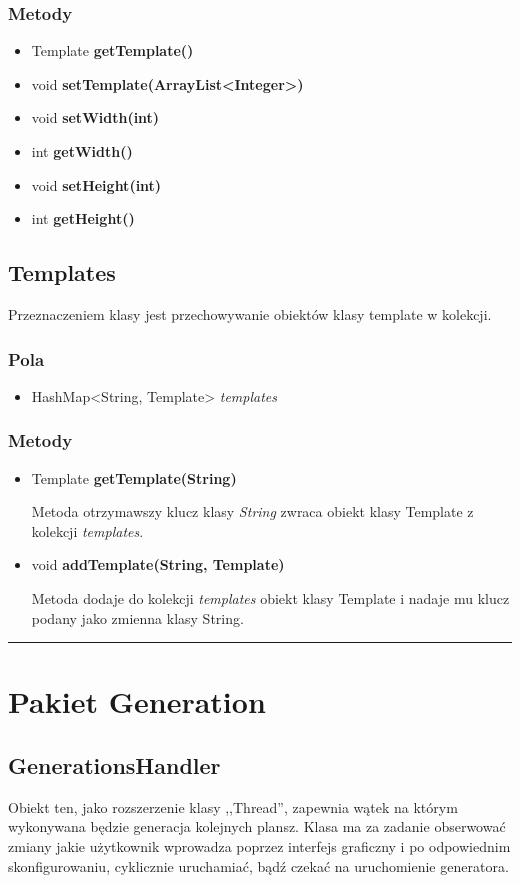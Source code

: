 \documentclass[a4paper,11pt]{article}
\newcommand{\linia}{\rule{\linewidth}{0.4mm}}
\begin{document}
\subsubsection{Metody}
\begin{itemize}
\item Template \textbf{getTemplate()}
\item void \textbf{setTemplate(ArrayList<Integer>)}
\item void \textbf{setWidth(int)}
\item int \textbf{getWidth()}
\item void \textbf{setHeight(int)}
\item int \textbf{getHeight()}
\end{itemize}


\subsection{Templates}
Przeznaczeniem klasy jest przechowywanie obiektów klasy template w kolekcji.
\subsubsection{Pola}
\begin{itemize}
\item HashMap<String, Template> \textit{templates}
\end{itemize}
\subsubsection{Metody}
\begin{itemize}
\item Template \textbf{getTemplate(String)}

Metoda otrzymawszy klucz klasy \textit{String} zwraca obiekt klasy Template z kolekcji \textit{templates}.
\item void \textbf{addTemplate(String, Template)}

Metoda dodaje do kolekcji \textit{templates} obiekt klasy Template i nadaje mu klucz podany jako zmienna klasy String.
\end{itemize}
\noindent\linia

\section{Pakiet Generation}



\subsection{GenerationsHandler}
Obiekt ten, jako rozszerzenie klasy ,,Thread'', zapewnia wątek na którym wykonywana będzie generacja kolejnych plansz. Klasa ma za zadanie obserwować zmiany jakie użytkownik wprowadza poprzez interfejs graficzny i po odpowiednim skonfigurowaniu, cyklicznie uruchamiać, bądź czekać na uruchomienie generatora.
\end{document}
